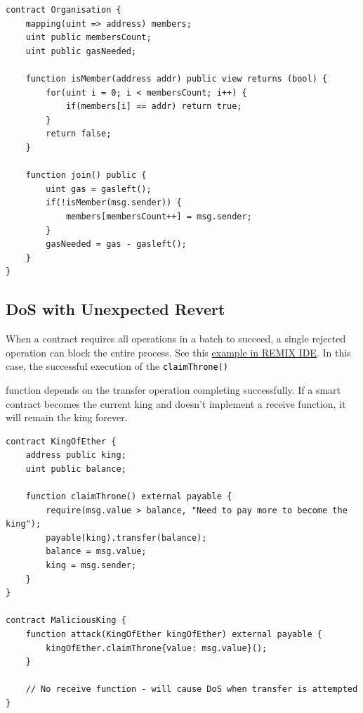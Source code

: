 \documentclass[12pt]{article}
\newcommand{\codegrey}[1]{%
  \texttt{\colorbox{black!4}{\textcolor{black}{#1}}}%
}
\begin{document}
\noindent
\begin{minipage}{\textwidth}
    \begin{lstlisting}[language=Solidity, caption=DoS with Block Gas Limit Example]
contract Organisation {
    mapping(uint => address) members;
    uint public membersCount;
    uint public gasNeeded;

    function isMember(address addr) public view returns (bool) {
        for(uint i = 0; i < membersCount; i++) {
            if(members[i] == addr) return true;
        }
        return false;
    }

    function join() public {
        uint gas = gasleft();
        if(!isMember(msg.sender)) {
            members[membersCount++] = msg.sender;
        }
        gasNeeded = gas - gasleft();
    }
}
\end{lstlisting}
\end{minipage}

\subsection{DoS with Unexpected Revert}

When a contract requires all operations in a batch to succeed, a single
rejected operation can block the entire process. See this
\href{https://remix.ethereum.org/?#activate=solidity&url=https://github.com/radovluk/unbreakable-vault/contracts/DoS02.sol&lang=en&optimize=false&runs=200&evmVersion=null&version=soljson-v0.8.28+commit.7893614a.js}{example
    in REMIX IDE}. In this case, the successful execution of the \codegrey{claimThrone()}
function depends on the transfer operation completing successfully. If a smart
contract becomes the current king and doesn't implement a receive function, it
will remain the king forever.

\noindent
\begin{minipage}{\textwidth}
    \begin{lstlisting}[language=Solidity, caption=DoS with Revert Example]
contract KingOfEther {
    address public king;
    uint public balance;

    function claimThrone() external payable {
        require(msg.value > balance, "Need to pay more to become the king");
        payable(king).transfer(balance);
        balance = msg.value;
        king = msg.sender;
    }
}

contract MaliciousKing {    
    function attack(KingOfEther kingOfEther) external payable {
        kingOfEther.claimThrone{value: msg.value}();
    }

    // No receive function - will cause DoS when transfer is attempted
}
\end{lstlisting}
\end{minipage}
\end{document}
